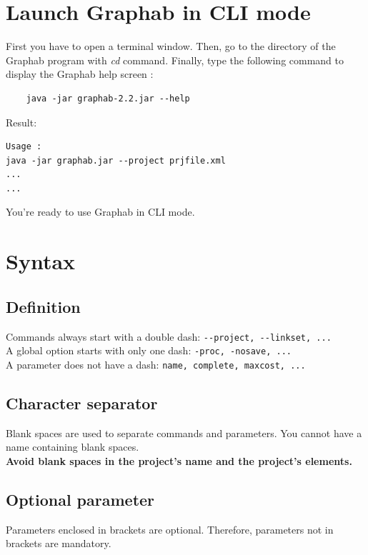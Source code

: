 \documentclass[a4paper,10pt]{report}
\begin{document}
\section{Launch Graphab in CLI mode}
First you have to open a terminal window.
Then, go to the directory of the Graphab program with \textit{cd} command.
Finally, type the following command to display the Graphab help screen :
\begin{Verbatim}
	java -jar graphab-2.2.jar --help
\end{Verbatim}
Result:
\begin{verbatim}
Usage :
java -jar graphab.jar --project prjfile.xml
...
...
\end{verbatim}
You're ready to use Graphab in CLI mode.

\section{Syntax}
\subsection{Definition}
Commands always start with a double dash: \verb|--project, --linkset, ...|\\
A global option starts with only one dash: \verb|-proc, -nosave, ...|\\
A parameter does not have a dash: \verb|name, complete, maxcost, ...|
\subsection{Character separator}
Blank spaces are used to separate commands and parameters. You cannot have a name containing blank spaces.\\
\textbf{Avoid blank spaces in the project's name and the project's elements.}
\subsection{Optional parameter}
Parameters enclosed in brackets are optional. 
Therefore, parameters not in brackets are mandatory.
\end{document}
